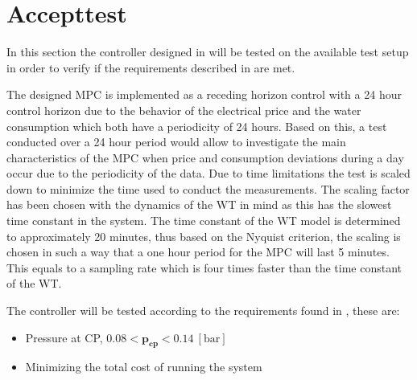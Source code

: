 \chapter{Accepttest}
\label{accepttest}

In this section the controller designed in  will be tested on the available test setup in order to verify if the requirements described in  are met. 

The designed MPC is implemented as a receding horizon control with a 24 hour control horizon due to the behavior of the electrical price and the water consumption which both have a periodicity of 24 hours. 
Based on this, a test conducted over a 24 hour period would allow to investigate the main characteristics of the MPC when price and consumption deviations during a day occur due to the periodicity of the data.   
Due to time limitations the test is scaled down to minimize the time used to conduct the measurements. 
The scaling factor has been chosen with the dynamics of the WT in mind as this has the slowest time constant in the system. 
The time constant of the WT model is determined to approximately 20 minutes, thus based on the Nyquist criterion, the scaling is chosen in such a way that a one hour period for the MPC will last 5 minutes. This equals to a sampling rate which is four times faster than the time constant of the WT. 

The controller will be tested according to the requirements found in , these are: 

\begin{itemize}
	\item Pressure at CP, $0.08 < \pmb{p_{cp}} < 0.14 \:[\text{bar}]$
%
	\item Minimizing the total cost of running the system
\end{itemize}    